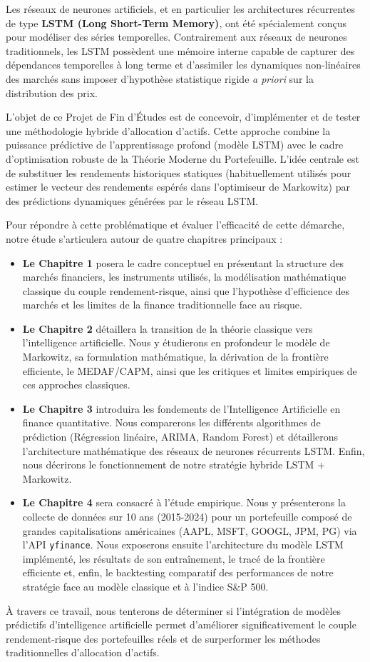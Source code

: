 Les réseaux de neurones artificiels, et en particulier les architectures récurrentes de type \textbf{LSTM (Long Short-Term Memory)}, ont été spécialement conçus pour modéliser des séries temporelles. Contrairement aux réseaux de neurones traditionnels, les LSTM possèdent une mémoire interne capable de capturer des dépendances temporelles à long terme et d'assimiler les dynamiques non-linéaires des marchés sans imposer d'hypothèse statistique rigide \textit{a priori} sur la distribution des prix. 

L'objet de ce Projet de Fin d'Études est de concevoir, d'implémenter et de tester une méthodologie hybride d'allocation d'actifs. Cette approche combine la puissance prédictive de l'apprentissage profond (modèle LSTM) avec le cadre d'optimisation robuste de la Théorie Moderne du Portefeuille. L'idée centrale est de substituer les rendements historiques statiques (habituellement utilisés pour estimer le vecteur des rendements espérés dans l'optimiseur de Markowitz) par des prédictions dynamiques générées par le réseau LSTM.

Pour répondre à cette problématique et évaluer l'efficacité de cette démarche, notre étude s'articulera autour de quatre chapitres principaux :

\begin{itemize}
    \item \textbf{Le Chapitre 1} posera le cadre conceptuel en présentant la structure des marchés financiers, les instruments utilisés, la modélisation mathématique classique du couple rendement-risque, ainsi que l'hypothèse d'efficience des marchés et les limites de la finance traditionnelle face au risque.
    \item \textbf{Le Chapitre 2} détaillera la transition de la théorie classique vers l'intelligence artificielle. Nous y étudierons en profondeur le modèle de Markowitz, sa formulation mathématique, la dérivation de la frontière efficiente, le MEDAF/CAPM, ainsi que les critiques et limites empiriques de ces approches classiques.
    \item \textbf{Le Chapitre 3} introduira les fondements de l'Intelligence Artificielle en finance quantitative. Nous comparerons les différents algorithmes de prédiction (Régression linéaire, ARIMA, Random Forest) et détaillerons l'architecture mathématique des réseaux de neurones récurrents LSTM. Enfin, nous décrirons le fonctionnement de notre stratégie hybride LSTM + Markowitz.
    \item \textbf{Le Chapitre 4} sera consacré à l'étude empirique. Nous y présenterons la collecte de données sur 10 ans (2015-2024) pour un portefeuille composé de grandes capitalisations américaines (AAPL, MSFT, GOOGL, JPM, PG) via l'API \texttt{yfinance}. Nous exposerons ensuite l'architecture du modèle LSTM implémenté, les résultats de son entraînement, le tracé de la frontière efficiente et, enfin, le backtesting comparatif des performances de notre stratégie face au modèle classique et à l'indice S\&P 500.
\end{itemize}

À travers ce travail, nous tenterons de déterminer si l'intégration de modèles prédictifs d'intelligence artificielle permet d'améliorer significativement le couple rendement-risque des portefeuilles réels et de surperformer les méthodes traditionnelles d'allocation d'actifs.
